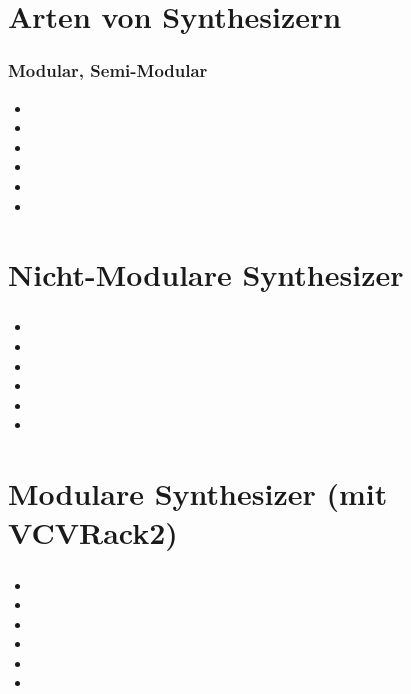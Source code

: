\documentclass[ngerman]{beamer}
\begin{document}
\section{Arten von Synthesizern}
 
\begin{frame}
\frametitle{Modular, Semi-Modular}

\begin{itemize}
\item 
\item 
\item 
\item 
\item 
\item 
\end{itemize}
\end{frame}

\section{Nicht-Modulare Synthesizer}
 
\begin{frame}
\frametitle{}


\begin{itemize}
\item 
\item 
\item 
\item 
\item 
\item 
\end{itemize}
\end{frame}
 
\section{Modulare Synthesizer (mit VCVRack2)} 
 
\begin{frame}
\frametitle{}


\begin{itemize}
\item 
\item 
\item 
\item 
\item 
\item 
\end{itemize}
\end{frame} 
 
 
\end{document}
